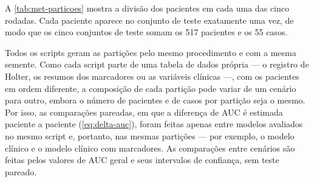 A \autoref{tab:met-particoes} mostra a divisão dos pacientes em cada uma
das cinco rodadas. Cada paciente aparece no conjunto de teste exatamente
uma vez, de modo que os cinco conjuntos de teste somam os 517 pacientes e
os 55 casos.

\begin{table}[h!]
	\captionsetup{width=15cm}
\end{table}

Todos os scripts geram as partições pelo mesmo procedimento e com a mesma
semente. Como cada script parte de uma tabela de dados própria --- o
registro de Holter, os resumos dos marcadores ou as variáveis clínicas ---,
com os pacientes em ordem diferente, a composição de cada partição pode
variar de um cenário para outro, embora o número de pacientes e de casos
por partição seja o mesmo. Por isso, as comparações pareadas, em que a
diferença de \gls{AUC} é estimada paciente a paciente
(\autoref{eq:delta-auc}), foram feitas apenas entre modelos avaliados no
mesmo script e, portanto, nas mesmas partições --- por exemplo, o modelo
clínico e o modelo clínico com marcadores. As comparações entre cenários
são feitas pelos valores de \gls{AUC} geral e seus intervalos de confiança,
sem teste pareado.

